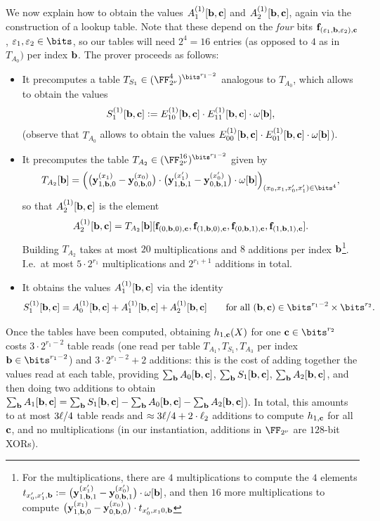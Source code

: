 \documentclass[11pt,letterpaper,usenames,dvipsnames]{article}
\begin{document}
We now explain how to obtain the values $A_1^{(1)}[\mathbf{b},\mathbf{c}]$ and $A_2^{(1)}[\mathbf{b},\mathbf{c}]$, again via the construction of a lookup table. Note that these depend on the \emph{four} bits $\mathbf{f}_{(\varepsilon_1,\mathbf{b},\varepsilon_2),\mathbf{c}}$, $\eps_1,\eps_2\in \bits$, so our tables will need $2^4=16$ entries (as opposed to $4$ as in $T_{A_0})$ per  index $\mathbf{b}$.
The prover  proceeds as follows:
\begin{itemize}[leftmargin=*]
    \item It precomputes a table $T_{S_1}\in (\comfield^4)^{\bits^{r_1-2}}$ analogous to $T_{A_0}$, which allows to obtain the values 
    $$S_1^{(1)}[\mathbf{b},\mathbf{c}] {\;\vcentcolon=\;} E_{10}^{(1)}[\mathbf{b},\mathbf{c}]\cdot E_{11}^{(1)}[\mathbf{b},\mathbf{c}]\cdot \omega[\mathbf{b}],$$
    (observe that $T_{A_0}$ allows to obtain the values $E_{00}^{(1)}[\mathbf{b},\mathbf{c}]\cdot E_{01}^{(1)}[\mathbf{b},\mathbf{c}]\cdot \omega[\mathbf{b}]$).
    \item It precomputes the table $T_{A_2}\in (\comfield^{16})^{\bits^{r_1-2}}$ given by
    \begin{equation}\label{e:TA2}T_{A_2}[\bb]=\Big( \big(\yy_{1,\bb,0}^{(x_1)}-\yy_{0,\bb,0}^{(x_0)}\big)\cdot \big(\yy_{1,\bb,1}^{(x_1')}-\yy_{0,\bb,1}^{(x_0')}\big)\cdot \omega[\bb] \Big)_{(x_0,x_1,x_0',x_1')\in \bits^4},\end{equation}
    so that $A_2^{(1)}[\mathbf{b},\mathbf{c}]$ is the element  $$A_2^{(1)}[\mathbf{b},\mathbf{c}]=T_{A_2}[\mathbf{b}][\mathbf{f}_{(0,\mathbf{b},0),\mathbf{c}},\mathbf{f}_{(1,\mathbf{b},0),\mathbf{c}},\mathbf{f}_{(0,\mathbf{b},1),\mathbf{c}},\mathbf{f}_{(1,\mathbf{b},1),\mathbf{c}}].$$ Building $T_{A_2}$ takes at most $20$ multiplications and $8$ additions per index $\mathbf{b}$\footnote{For the multiplications, there are $4$ multiplications to compute the $4$ elements $t_{x_0',x_1',\mathbf{b}}{\;\vcentcolon=\;} \big(\mathbf{y}_{1,\mathbf{b},1}^{(x_1')}-\mathbf{y}_{0,\mathbf{b},1}^{(x_0')}\big)\cdot \omega[\mathbf{b}]$, and then $16$ more multiplications to compute $\big(\mathbf{y}_{1,\mathbf{b},0}^{(x_1)}-\mathbf{y}_{0,\mathbf{b},0}^{(x_0)}\big)\cdot t_{x_0',x_10,\mathbf{b}}$}. I.e.\ at most $5\cdot 2^{r_1}$ multiplications and $2^{r_1+1}$ additions in total.
    \item It obtains the values $A_1^{(1)}[\mathbf{b},\mathbf{c}]$ via the identity $$S_1^{(1)}[\bb,\cc] = A_0^{(1)}[\bb,\cc]+A_1^{(1)}[\bb,\cc]+A_2^{(1)}[\bb,\cc] \qquad \text{for all } (\bb,\cc)\in \bits^{r_1-2}\times \bits^{r_2}.$$ %
\end{itemize}
 Once the tables have been computed,  obtaining $h_{1,\mathbf{c}}(X)$ for one $\cc\in \bits^{r_2}$ costs $3\cdot 2^{r_1-2}$ table reads (one read per table $T_{A_1}, T_{S_1}, T_{A_3}$ per index $\bb\in \bits^{r_1-2}$) and $3\cdot 2^{r_1-2} +2$ additions: this is the cost of adding together the values read at each table, providing $\sum_{\mathbf{b}} A_0[\mathbf{b},\mathbf{c}]$,  $\sum_{\mathbf{b}} S_1[\mathbf{b},\mathbf{c}]$,  $\sum_{\mathbf{b}} A_2[\mathbf{b},\mathbf{c}]$, and then doing two additions to obtain $\sum_{\mathbf{b}} A_1[\mathbf{b},\mathbf{c}] = \sum_{\mathbf{b}} S_1[\mathbf{b},\mathbf{c}] -\sum_{\mathbf{b}} A_0[\mathbf{b},\mathbf{c}] - \sum_{\mathbf{b}} A_2[\mathbf{b},\mathbf{c}]$). In total, this amounts to at most  
 $3\ell/4$ table reads and $\approx 3\ell/4 +2\cdot \ell_2$ additions to compute $h_{1,\mathbf{c}}$ for all $\mathbf{c}$, and no multiplications (in our instantiation, additions in $\comfield$ are $128$-bit XORs). 
 
\end{document}
